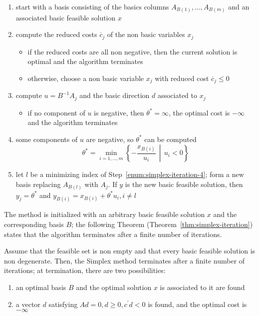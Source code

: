 \documentclass[english]{article}
\begin{document}
\begin{enumerate}[label=\textbf{\arabic*.}, ref=(\arabic*)]
  \item \label{enum:simplex-iteration-1}start with a basis consisting of the basics columns \(A_{B(1)}, \ldots, A_{B(m)}\) and an associated basic feasible solution \(x\)
  \item \label{enum:simplex-iteration-2}compute the reduced costs \(\overline{c}_j\) of the non basic variables \(x_j\)
        \begin{itemize}[label=\(\rightarrow\)]
          \item if the reduced costs are all non negative, then the current solution is optimal and the algorithm terminates
          \item otherwise, choose a non basic variable \(x_j\) with reduced cost \(\overline{c}_j \leq 0\)
        \end{itemize}
  \item \label{enum:simplex-iteration-3}compute \(u = B^{-1} A_j\) and the basic direction \(d\) associated to \(x_j\)
        \begin{itemize}[label=\(\rightarrow\)]
          \item if no component of \(u\) is negative, then \(\theta^\ast = \infty\), the optimal cost is \(-\infty\) and the algorithm terminates
        \end{itemize}
  \item \label{enum:simplex-iteration-4}some components of \(u\) are negative, so \(\theta^\ast\) can be computed
        \[ \theta^\ast = \min_{i=1, \ldots, m} \left\{ - \dfrac{x_{B(i)}}{u_i} \,\middle\vert\, u_i < 0 \right\} \]
  \item \label{enum:simplex-iteration-5}let \(l\) be a minimizing index of Step~\ref{enum:simplex-iteration-4}; form a new basis replacing \(A_{B(l)}\) with \(A_j\).
        If \(y\) is the new basic feasible solution, then \(y_j = \theta^\ast\) and \(y_{B(i)} = x_{B(i)} + \theta^\ast u_i, i \neq l\)
\end{enumerate}

\bigskip
The method is initialized with an arbitrary basic feasible solution \(x\) and the corresponding basis \(B\);
the following Theorem (Theorem~\ref{thm:simplex-iteration}) states that the algorithm terminates after a finite number of iterations.

\begin{theorem}
  Assume that the feasible set is non empty and that every basic feasible solution is non degenerate.
  Then, the Simplex method terminates after a finite number of iterations;
  at termination, there are two possibilities:
  \begin{enumerate}
    \item an optimal basis \(B\) and the optimal solution \(x\) is associated to it are found
    \item a vector \(d\) satisfying \(Ad = 0, d \geq 0, c^\prime d < 0\) is found, and the optimal cost is \(-\infty\)
  \end{enumerate}
  \label{thm:simplex-iteration}
\end{theorem}
\end{document}
